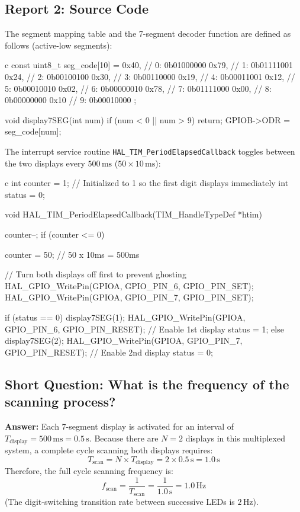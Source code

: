 \documentclass{hcmut-report}
\begin{document}
\subsection*{Report 2: Source Code}
The segment mapping table and the 7-segment decoder function are defined as follows (active-low segments):
\begin{code}{c}
const uint8_t seg_code[10] = {
    0x40, // 0: 0b01000000
    0x79, // 1: 0b01111001
    0x24, // 2: 0b00100100
    0x30, // 3: 0b00110000
    0x19, // 4: 0b00011001
    0x12, // 5: 0b00010010
    0x02, // 6: 0b00000010
    0x78, // 7: 0b01111000
    0x00, // 8: 0b00000000
    0x10  // 9: 0b00010000
};

void display7SEG(int num) {
    if (num < 0 || num > 9) return;
    GPIOB->ODR = seg_code[num];
}
\end{code}

The interrupt service routine \texttt{HAL\_TIM\_PeriodElapsedCallback} toggles between the two displays every $500\,\text{ms}$ ($50 \times 10\,\text{ms}$):
\begin{code}{c}
int counter = 1;   // Initialized to 1 so the first digit displays immediately
int status  = 0;

void HAL_TIM_PeriodElapsedCallback(TIM_HandleTypeDef *htim)
{
    counter--;
    if (counter <= 0) {
        counter = 50;  // 50 x 10ms = 500ms

        // Turn both displays off first to prevent ghosting
        HAL_GPIO_WritePin(GPIOA, GPIO_PIN_6, GPIO_PIN_SET);
        HAL_GPIO_WritePin(GPIOA, GPIO_PIN_7, GPIO_PIN_SET);

        if (status == 0) {
            display7SEG(1);
            HAL_GPIO_WritePin(GPIOA, GPIO_PIN_6, GPIO_PIN_RESET);  // Enable 1st display
            status = 1;
        } else {
            display7SEG(2);
            HAL_GPIO_WritePin(GPIOA, GPIO_PIN_7, GPIO_PIN_RESET);  // Enable 2nd display
            status = 0;
        }
    }
}
\end{code}

\subsection*{Short Question: What is the frequency of the scanning process?}
\textbf{Answer:}
Each 7-segment display is activated for an interval of $T_{\text{display}} = 500\,\text{ms} = 0.5\,\text{s}$.
Because there are $N = 2$ displays in this multiplexed system, a complete cycle scanning both displays requires:
\begin{equation}
    T_{\text{scan}} = N \times T_{\text{display}} = 2 \times 0.5\,\text{s} = 1.0\,\text{s}
\end{equation}
Therefore, the full cycle scanning frequency is:
\begin{equation}
    f_{\text{scan}} = \frac{1}{T_{\text{scan}}} = \frac{1}{1.0\,\text{s}} = 1.0\,\text{Hz}
\end{equation}
(The digit-switching transition rate between successive LEDs is $2\,\text{Hz}$).
\end{document}
